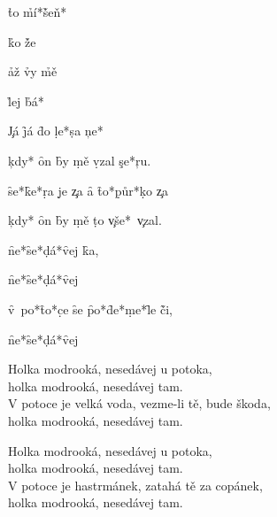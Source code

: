    
 \h{to} \h{mí*}\h{šeň*} 

   
\h{ko} \h{že} 

 \h{až} \h{vy} \h{mě} 
    

    
\h{lej} \h{bá*}



\c{Já}   
\f{já} \f{do} \d{le*}\d{sa} \c{ne*}

\c{kdy*}    
\f{on} \f{by} \d{mě} \d{vzal} \c{se*}\c{ru.}

\f{se*}\f{ke*}\d{ra} \d{je} \c{za}  
\f{a} \f{to*}\d{půr*}\d{ko} \c{za} 

\c{kdy*}    
\f{on} \f{by} \d{mě} \d{to} \c{vše*}~\c{vzal.}



\pp{}\p {}
\f{ne*}\f{se*}\d{dá*}\f{vej}  \f{ka,}

\pp{}\p {}
\f{ne*}\f{se*}\d{dá*}\f{vej} 

\f{v~po*}\f{to*}\d{ce} \f{se}  
\f{po*}\f{de*}\d{me*}\f{le}  \f{či,}

\pp{}\p {}
\f{ne*}\f{se*}\d{dá*}\f{vej} 

Holka modrooká, nesedávej u potoka,\\
holka modrooká, nesedávej tam.\\
V potoce je velká voda, vezme-li tě, bude škoda,\\
holka modrooká, nesedávej tam.

Holka modrooká, nesedávej u potoka,\\
holka modrooká, nesedávej tam.\\
V potoce je hastrmánek, zatahá tě za copánek,\\
holka modrooká, nesedávej tam.

\bye
